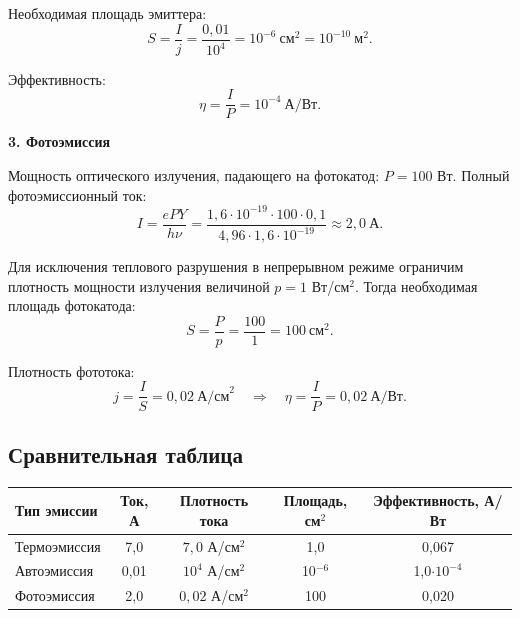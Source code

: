 \documentclass[12pt]{article}
\begin{document}
Необходимая площадь эмиттера:
\[
S = \frac{I}{j} = \frac{0,01}{10^4} = 10^{-6}\ \text{см}^2 = 10^{-10}\ \text{м}^2.
\]

Эффективность:
\[
\eta = \frac{I}{P} = 10^{-4}\ \text{А/Вт}.
\]

\noindent\textbf{3. Фотоэмиссия}

Мощность оптического излучения, падающего на фотокатод: $P = 100$ Вт. Полный фотоэмиссионный ток:
\[
I = \frac{e P Y}{h\nu} = \frac{1,6\cdot10^{-19} \cdot 100 \cdot 0,1}{4,96 \cdot 1,6\cdot10^{-19}} \approx 2,0\ \text{А}.
\]

Для исключения теплового разрушения в непрерывном режиме ограничим плотность мощности излучения величиной $p = 1$ Вт/см$^2$. Тогда необходимая площадь фотокатода:
\[
S = \frac{P}{p} = \frac{100}{1} = 100\ \text{см}^2.
\]

Плотность фототока:
\[
j = \frac{I}{S} = 0,02\ \text{А/см}^2 \quad \Rightarrow  \quad \eta = \frac{I}{P} = 0,02\ \text{А/Вт}.
\]

\subsection*{Сравнительная таблица}
\begin{table}[H]
\centering
\begin{tabular}{|l|c|c|c|c|}
\hline
\textbf{Тип эмиссии} & \textbf{Ток, А} & \textbf{Плотность тока} & \textbf{Площадь, см$^2$} & \textbf{Эффективность, А/Вт} \\
\hline
Термоэмиссия & 7,0 & $7,0$ А/см$^2$ & 1,0 & 0,067 \\
\hline
Автоэмиссия & 0,01 & $10^4$ А/см$^2$ & 10$^{-6}$ & 1,0$\cdot10^{-4}$ \\
\hline
Фотоэмиссия & 2,0 & $0,02$ А/см$^2$ & 100 & 0,020 \\
\hline
\end{tabular}
\label{tab:comparison_Ua}
\end{table}

\end{document}
